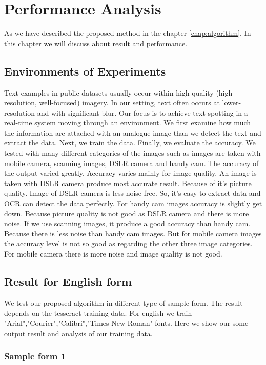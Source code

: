 \chapter {Performance Analysis}
\label{chap:result}
As we have described the proposed method in the chapter \ref{chap:algorithm}. In this chapter we will discuss about result and performance.
\section{Environments of Experiments}
Text examples in public datasets usually occur within high-quality (high-resolution, well-focused) imagery. In our setting, text often occurs at lower-resolution and with significant blur. Our focus is to achieve text spotting in a real-time system moving through an environment. We first examine how much the information are attached with an analogue image than we detect the text and extract the data. Next, we train the data. Finally, we evaluate the accuracy.
We tested with many different categories of the images such as images are taken with mobile camera, scanning images, DSLR camera and handy cam. The accuracy of the output varied greatly. Accuracy varies mainly for image quality. An image is taken with DSLR camera produce most accurate result. Because of it’s picture quality. Image of DSLR camera is less noise free. So, it’s easy to extract data and OCR can detect the data perfectly. For handy cam images accuracy is slightly get down. Because picture quality is not good as DSLR camera and there is more noise.
If we use scanning images, it produce a good accuracy than handy cam. Because there is less noise than handy cam images. But for mobile camera images the accuracy level is not so good as regarding the other three image categories. For mobile camera there is more noise and image quality is not good.   

\section{Result for English form}
We test our proposed algorithm in different type of sample form. The result depends on the tesseract training data. For english we train "Arial","Courier","Calibri","Times New Roman" fonts. Here we show our some output result and analysis of our training data.
\subsection{Sample form 1}

